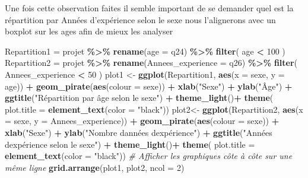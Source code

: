 \documentclass[
]{article}
\newenvironment{Shaded}{\begin{snugshade}}{\end{snugshade}}
\newcommand{\AttributeTok}[1]{\textcolor[rgb]{0.13,0.29,0.53}{#1}}
\newcommand{\CommentTok}[1]{\textcolor[rgb]{0.56,0.35,0.01}{\textit{#1}}}
\newcommand{\DecValTok}[1]{\textcolor[rgb]{0.00,0.00,0.81}{#1}}
\newcommand{\FunctionTok}[1]{\textcolor[rgb]{0.13,0.29,0.53}{\textbf{#1}}}
\newcommand{\NormalTok}[1]{#1}
\newcommand{\OtherTok}[1]{\textcolor[rgb]{0.56,0.35,0.01}{#1}}
\newcommand{\SpecialCharTok}[1]{\textcolor[rgb]{0.81,0.36,0.00}{\textbf{#1}}}
\newcommand{\StringTok}[1]{\textcolor[rgb]{0.31,0.60,0.02}{#1}}
\begin{document}
\hfill\break
Une fois cette observation faites il semble important de se demander
quel est la répartition par Années d'expérience selon le sexe nous
l'alignerons avec un boxplot sur les ages afin de mieux les analyser

\hfill\break

\begin{Shaded}
\begin{Highlighting}[]
\NormalTok{Repartition1 }\OtherTok{=}\NormalTok{ projet }\SpecialCharTok{\%\textgreater{}\%}
\FunctionTok{rename}\NormalTok{(}\AttributeTok{age =}\NormalTok{ q24) }\SpecialCharTok{\%\textgreater{}\%}
\FunctionTok{filter}\NormalTok{( age }\SpecialCharTok{\textless{}} \DecValTok{100}\NormalTok{ )}
\NormalTok{Repartition2 }\OtherTok{=}\NormalTok{ projet }\SpecialCharTok{\%\textgreater{}\%}
\FunctionTok{rename}\NormalTok{(}\AttributeTok{Annees\_experience =}\NormalTok{ q26) }\SpecialCharTok{\%\textgreater{}\%}
  \FunctionTok{filter}\NormalTok{( Annees\_experience }\SpecialCharTok{\textless{}} \DecValTok{50}\NormalTok{ )}
\NormalTok{plot1 }\OtherTok{\textless{}{-}} \FunctionTok{ggplot}\NormalTok{(Repartition1, }\FunctionTok{aes}\NormalTok{(}\AttributeTok{x =}\NormalTok{ sexe, }\AttributeTok{y =}\NormalTok{ age)) }\SpecialCharTok{+}
\FunctionTok{geom\_pirate}\NormalTok{(}\FunctionTok{aes}\NormalTok{(}\AttributeTok{colour =}\NormalTok{ sexe)) }\SpecialCharTok{+}
\FunctionTok{xlab}\NormalTok{(}\StringTok{"Sexe"}\NormalTok{) }\SpecialCharTok{+}
\FunctionTok{ylab}\NormalTok{(}\StringTok{"Âge"}\NormalTok{) }\SpecialCharTok{+}
\FunctionTok{ggtitle}\NormalTok{(}\StringTok{"Répartition par âge selon le sexe"}\NormalTok{) }\SpecialCharTok{+}
\FunctionTok{theme\_light}\NormalTok{()}\SpecialCharTok{+}
\FunctionTok{theme}\NormalTok{(}
\AttributeTok{plot.title =} \FunctionTok{element\_text}\NormalTok{(}\AttributeTok{color =} \StringTok{"black"}\NormalTok{))}
\NormalTok{plot2}\OtherTok{\textless{}{-}} \FunctionTok{ggplot}\NormalTok{(Repartition2, }\FunctionTok{aes}\NormalTok{(}\AttributeTok{x =}\NormalTok{ sexe, }\AttributeTok{y =}\NormalTok{ Annees\_experience)) }\SpecialCharTok{+}
\FunctionTok{geom\_pirate}\NormalTok{(}\FunctionTok{aes}\NormalTok{(}\AttributeTok{colour =}\NormalTok{ sexe)) }\SpecialCharTok{+}
\FunctionTok{xlab}\NormalTok{(}\StringTok{"Sexe"}\NormalTok{) }\SpecialCharTok{+}
\FunctionTok{ylab}\NormalTok{(}\StringTok{"Nombre d\textquotesingle{}années d\textquotesingle{}expérience"}\NormalTok{) }\SpecialCharTok{+}
\FunctionTok{ggtitle}\NormalTok{(}\StringTok{"Années d\textquotesingle{}expérience selon le sexe"}\NormalTok{) }\SpecialCharTok{+}
\FunctionTok{theme\_light}\NormalTok{()}\SpecialCharTok{+}
\FunctionTok{theme}\NormalTok{(}
\AttributeTok{plot.title =} \FunctionTok{element\_text}\NormalTok{(}\AttributeTok{color =} \StringTok{"black"}\NormalTok{))}
\CommentTok{\# Afficher les graphiques côte à côte sur une même ligne}
\FunctionTok{grid.arrange}\NormalTok{(plot1, plot2, }\AttributeTok{ncol =} \DecValTok{2}\NormalTok{)}
\end{Highlighting}
\end{Shaded}
\end{document}
